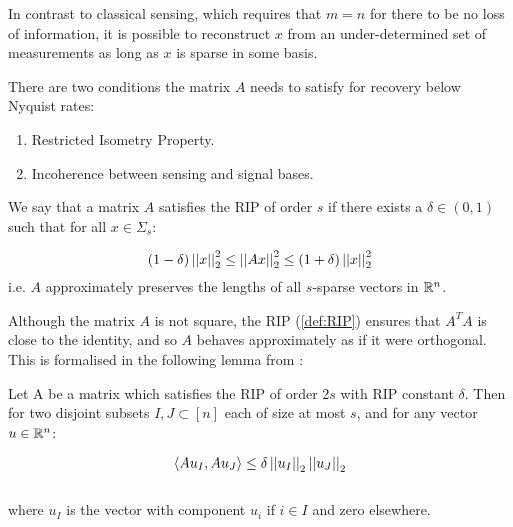 In contrast to classical sensing, which requires that \(m = n\) for there to be no loss of information, it is possible to reconstruct \(x\) from an under-determined set of measurements as long as \(x\) is sparse in some basis. 

There are two conditions the matrix \(A\) needs to satisfy for recovery below Nyquist rates:

\begin{enumerate}
\item Restricted Isometry Property.
\item Incoherence between sensing and signal bases.
\end{enumerate}

\begin{definition}[RIP]\label{def:RIP}
We say that a matrix \(A\) satisfies the RIP of order \(s\) if there exists a \(\delta \in \left(0, 1\right)\) such that for all \(x \in \Sigma_s\):

\begin{equation}
\left(1 - \delta\right) \left|\left|x\right|\right|_2^2 \leq \left|\left|Ax\right|\right|_2^2 \leq \left(1 + \delta\right) \left|\left|x\right|\right|_2^2
\end{equation}
i.e. \(A\) approximately preserves the lengths of all \(s\)-sparse vectors in \({\mathbb{R}}^n\). 
\label{def:RIP}
\end{definition}

\begin{remark}
Although the matrix \(A\) is not square, the RIP (\ref{def:RIP}) ensures that \(A^TA\) is close to the identity, and so \(A\) behaves approximately as if it were orthogonal. This is formalised in the following lemma from \cite{shalev2014understanding}:

\begin{lemma}
Let A be a matrix which satisfies the RIP of order 2\(s\) with RIP constant \(\delta\). Then for two disjoint subsets \(I, J \subset \left[n\right]\) each of size at most \(s\), and for any vector \(u \in {\mathbb{R}}^n\):

\begin{equation}
\langle Au_I, Au_J \rangle \leq \delta \left|\left|u_I\right|\right|_2 \left|\left|u_J\right|\right|_2
\end{equation}
\\
where \(u_I\) is the vector with component \(u_i\) if \(i \in I\) and zero elsewhere.

\end{lemma}

\end{remark}

